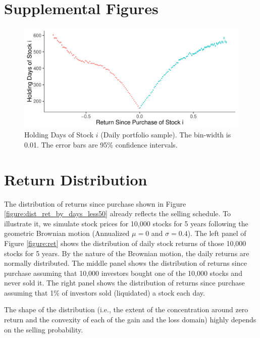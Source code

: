 \documentclass[11pt, a4paper]{article}
\begin{document}
\begin{appendices}
\section{Supplemental Figures}

\begin{figure}[H]
	\centering
	\includegraphics[width=0.8\columnwidth]{barc_holding_days_daily_3.pdf}
	\caption{Holding Days of Stock $i$ (Daily portfolio sample). The bin-width is 0.01. The error bars are 95\% confidence intervals.}
	\label{figure:holding_days}
\end{figure}


\section{Return Distribution}
\label{section:ret}
The distribution of returns since purchase shown in Figure \ref{figure:dist_ret_by_days_less50} already reflects the selling schedule. To illustrate it, we simulate stock prices for 10,000 stocks for 5 years following the geometric Brownian motion (Annualized $\mu=0$ and $\sigma=0.4$). The left panel of Figure \ref{figure:ret} shows the distribution of daily stock returns of those 10,000 stocks for 5 years. By the nature of the Brownian motion, the daily returns are normally distributed. The middle panel shows the distribution of returns since purchase assuming that 10,000 investors bought one of the 10,000 stocks and never sold it. The right panel shows the distribution of returns since purchase assuming that 1\% of investors sold (liquidated) a stock each day. 

The shape of the distribution (i.e., the extent of the concentration around zero return and the convexity of each of the gain and the loss domain) highly depends on the selling probability.




\end{appendices}
\end{document}
